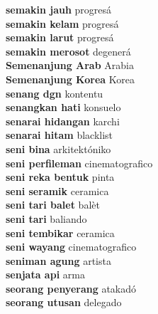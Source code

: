 \textbf{ semakin jauh  } progresá \\
\textbf{ semakin kelam  } progresá \\
\textbf{ semakin larut  } progresá \\
\textbf{ semakin merosot  } degenerá \\
\textbf{ Semenanjung Arab  } Arabia \\
\textbf{ Semenanjung Korea  } Korea \\
\textbf{ senang dgn  } kontentu \\
\textbf{ senangkan hati  } konsuelo \\
\textbf{ senarai hidangan  } karchi \\
\textbf{ senarai hitam  } blacklist \\
\textbf{ seni bina  } arkitektóniko \\
\textbf{ seni perfileman  } cinematografico \\
\textbf{ seni reka bentuk  } pinta \\
\textbf{ seni seramik  } ceramica \\
\textbf{ seni tari balet  } balèt \\
\textbf{ seni tari  } baliando \\
\textbf{ seni tembikar  } ceramica \\
\textbf{ seni wayang  } cinematografico \\
\textbf{ seniman agung  } artista \\
\textbf{ senjata api  } arma \\
\textbf{ seorang penyerang  } atakadó \\
\textbf{ seorang utusan  } delegado \\

